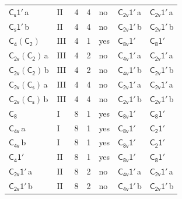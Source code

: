 \documentclass[10pt,a4paper]{article}
\numberwithin{equation}{section}
\newcommand{\grp}[1]{\mathsf{#1}}
\newcommand{\clsletter}[1]{\,{\scriptsize\color{black!55}#1}}
\begin{document}
{\begin{longtable}{@{}llrrlll@{}}
\href{C1v-1p.pdf}{$\grp{C_{s}1'}$}\clsletter{a} & II & 4 & 4 & no & \href{C2v-1p.pdf}{$\grp{C_{2v}1'}$}\clsletter{a} & \href{C2v-1p.pdf}{$\grp{C_{2v}1'}$}\clsletter{a}\\
\href{C1v-1p.pdf}{$\grp{C_{s}1'}$}\clsletter{b} & II & 4 & 4 & no & \href{C2v-1p.pdf}{$\grp{C_{2v}1'}$}\clsletter{b} & \href{C2v-1p.pdf}{$\grp{C_{2v}1'}$}\clsletter{b}\\
\href{C4-C2.pdf}{$\grp{C_{4}}(\grp{C_{2}})$} & III & 4 & 1 & yes & \href{C8v-1p.pdf}{$\grp{C_{8v}1'}$} & \href{C8-1p.pdf}{$\grp{C_{8}1'}$}\\
\href{C2v-C2.pdf}{$\grp{C_{2v}}(\grp{C_{2}})$}\clsletter{a} & III & 4 & 2 & no & \href{C4v-1p.pdf}{$\grp{C_{4v}1'}$}\clsletter{a} & \href{C2v-1p.pdf}{$\grp{C_{2v}1'}$}\clsletter{a}\\
\href{C2v-C2.pdf}{$\grp{C_{2v}}(\grp{C_{2}})$}\clsletter{b} & III & 4 & 2 & no & \href{C4v-1p.pdf}{$\grp{C_{4v}1'}$}\clsletter{b} & \href{C2v-1p.pdf}{$\grp{C_{2v}1'}$}\clsletter{b}\\
\href{C2v-C1v.pdf}{$\grp{C_{2v}}(\grp{C_{s}})$}\clsletter{a} & III & 4 & 4 & no & \href{C2v-1p.pdf}{$\grp{C_{2v}1'}$}\clsletter{a} & \href{C2v-1p.pdf}{$\grp{C_{2v}1'}$}\clsletter{a}\\
\href{C2v-C1v.pdf}{$\grp{C_{2v}}(\grp{C_{s}})$}\clsletter{b} & III & 4 & 4 & no & \href{C2v-1p.pdf}{$\grp{C_{2v}1'}$}\clsletter{b} & \href{C2v-1p.pdf}{$\grp{C_{2v}1'}$}\clsletter{b}\\
\href{../../../rotation/data/pdf/C8.pdf}{$\grp{C_{8}}$} & I & 8 & 1 & yes & \href{C8v-1p.pdf}{$\grp{C_{8v}1'}$} & \href{C8-1p.pdf}{$\grp{C_{8}1'}$}\\
\href{../../../rotation/data/pdf/C4v.pdf}{$\grp{C_{4v}}$}\clsletter{a} & I & 8 & 1 & yes & \href{C8v-1p.pdf}{$\grp{C_{8v}1'}$} & \href{C2-1p.pdf}{$\grp{C_{2}1'}$}\\
\href{../../../rotation/data/pdf/C4v.pdf}{$\grp{C_{4v}}$}\clsletter{b} & I & 8 & 1 & yes & \href{C8v-1p.pdf}{$\grp{C_{8v}1'}$} & \href{C2-1p.pdf}{$\grp{C_{2}1'}$}\\
\href{C4-1p.pdf}{$\grp{C_{4}1'}$} & II & 8 & 1 & yes & \href{C8v-1p.pdf}{$\grp{C_{8v}1'}$} & \href{C8-1p.pdf}{$\grp{C_{8}1'}$}\\
\href{C2v-1p.pdf}{$\grp{C_{2v}1'}$}\clsletter{a} & II & 8 & 2 & no & \href{C4v-1p.pdf}{$\grp{C_{4v}1'}$}\clsletter{a} & \href{C2v-1p.pdf}{$\grp{C_{2v}1'}$}\clsletter{a}\\
\href{C2v-1p.pdf}{$\grp{C_{2v}1'}$}\clsletter{b} & II & 8 & 2 & no & \href{C4v-1p.pdf}{$\grp{C_{4v}1'}$}\clsletter{b} & \href{C2v-1p.pdf}{$\grp{C_{2v}1'}$}\clsletter{b}\\

\end{longtable}}
\end{document}
